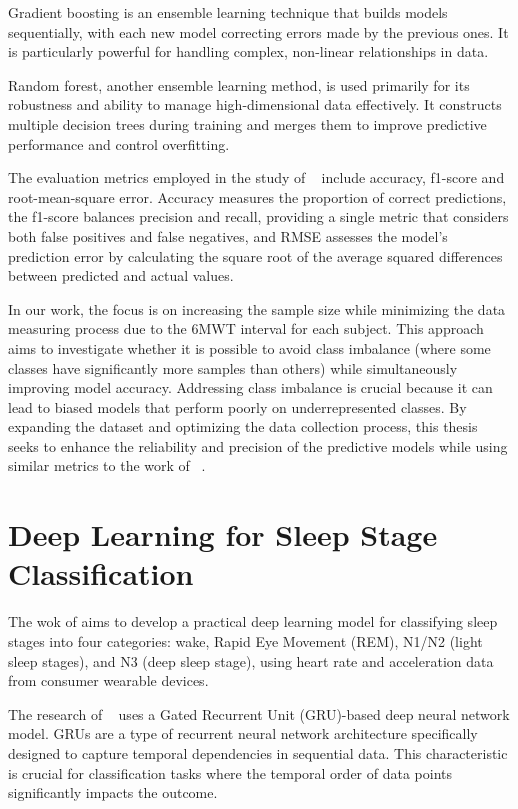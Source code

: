 Gradient boosting is an ensemble learning technique that builds models sequentially, with each new model correcting errors made by the previous ones. It is particularly powerful for handling complex, non-linear relationships in data.

Random forest, another ensemble learning method, is used primarily for its robustness and ability to manage high-dimensional data effectively. It constructs multiple decision trees during training and merges them to improve predictive performance and control overfitting.

The evaluation metrics employed in the study of ~\textcite{Stojancic} include accuracy, f1-score and root-mean-square error. Accuracy measures the proportion of correct predictions, the f1-score balances precision and recall, providing a single metric that considers both false positives and false negatives, and RMSE assesses the model's prediction error by calculating the square root of the average squared differences between predicted and actual values.

In our work, the focus is on increasing the sample size while minimizing the data measuring process due to the 6MWT interval for each subject. This approach aims to investigate whether it is possible to avoid class imbalance (where some classes have significantly more samples than others) while simultaneously improving model accuracy. Addressing class imbalance is crucial because it can lead to biased models that perform poorly on underrepresented classes. By expanding the dataset and optimizing the data collection process, this thesis seeks to enhance the reliability and precision of the predictive models while using similar metrics to the work of ~\textcite{Stojancic}.

\section{Deep Learning for Sleep Stage Classification}

The wok of \textcite{9754876} aims to develop a practical deep learning model for classifying sleep stages into four categories: wake, Rapid Eye Movement (REM), N1/N2 (light sleep stages), and N3 (deep sleep stage), using heart rate and acceleration data from consumer wearable devices.

The research of ~\textcite{9754876} uses a Gated Recurrent Unit (GRU)-based deep neural network model. GRUs are a type of recurrent neural network architecture specifically designed to capture temporal dependencies in sequential data. This characteristic is crucial for classification tasks where the temporal order of data points significantly impacts the outcome.

